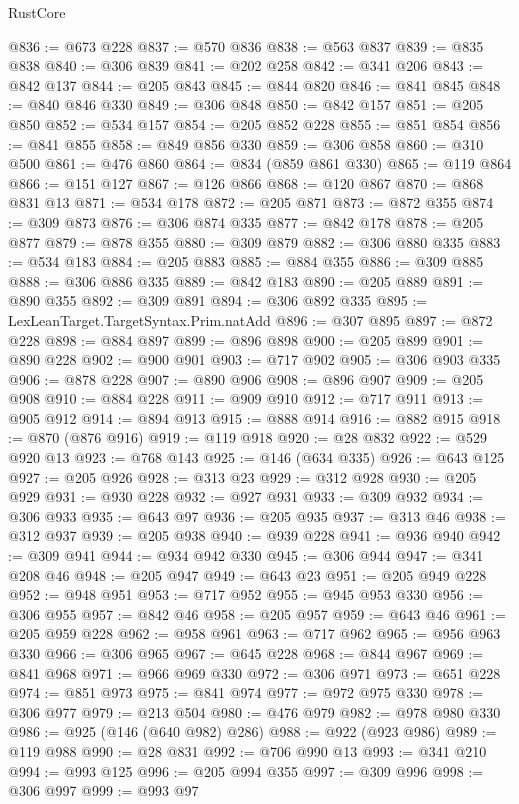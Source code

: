 \begin{lexlean}{RustCore}
\begin{coremodule}
@836 := @673 @228
@837 := @570 @836
@838 := @563 @837
@839 := @835 @838
@840 := @306 @839
@841 := @202 @258
@842 := @341 @206
@843 := @842 @137
@844 := @205 @843
@845 := @844 @820
@846 := @841 @845
@848 := @840 @846 @330
@849 := @306 @848
@850 := @842 @157
@851 := @205 @850
@852 := @534 @157
@854 := @205 @852 @228
@855 := @851 @854
@856 := @841 @855
@858 := @849 @856 @330
@859 := @306 @858
@860 := @310 @500
@861 := @476 @860
@864 := @834 (@859 @861 @330)
@865 := @119 @864
@866 := @151 @127
@867 := @126 @866
@868 := @120 @867
@870 := @868 @831 @13
@871 := @534 @178
@872 := @205 @871
@873 := @872 @355
@874 := @309 @873
@876 := @306 @874 @335
@877 := @842 @178
@878 := @205 @877
@879 := @878 @355
@880 := @309 @879
@882 := @306 @880 @335
@883 := @534 @183
@884 := @205 @883
@885 := @884 @355
@886 := @309 @885
@888 := @306 @886 @335
@889 := @842 @183
@890 := @205 @889
@891 := @890 @355
@892 := @309 @891
@894 := @306 @892 @335
@895 := LexLeanTarget.TargetSyntax.Prim.natAdd
@896 := @307 @895
@897 := @872 @228
@898 := @884 @897
@899 := @896 @898
@900 := @205 @899
@901 := @890 @228
@902 := @900 @901
@903 := @717 @902
@905 := @306 @903 @335
@906 := @878 @228
@907 := @890 @906
@908 := @896 @907
@909 := @205 @908
@910 := @884 @228
@911 := @909 @910
@912 := @717 @911
@913 := @905 @912
@914 := @894 @913
@915 := @888 @914
@916 := @882 @915
@918 := @870 (@876 @916)
@919 := @119 @918
@920 := @28 @832
@922 := @529 @920 @13
@923 := @768 @143
@925 := @146 (@634 @335)
@926 := @643 @125
@927 := @205 @926
@928 := @313 @23
@929 := @312 @928
@930 := @205 @929
@931 := @930 @228
@932 := @927 @931
@933 := @309 @932
@934 := @306 @933
@935 := @643 @97
@936 := @205 @935
@937 := @313 @46
@938 := @312 @937
@939 := @205 @938
@940 := @939 @228
@941 := @936 @940
@942 := @309 @941
@944 := @934 @942 @330
@945 := @306 @944
@947 := @341 @208 @46
@948 := @205 @947
@949 := @643 @23
@951 := @205 @949 @228
@952 := @948 @951
@953 := @717 @952
@955 := @945 @953 @330
@956 := @306 @955
@957 := @842 @46
@958 := @205 @957
@959 := @643 @46
@961 := @205 @959 @228
@962 := @958 @961
@963 := @717 @962
@965 := @956 @963 @330
@966 := @306 @965
@967 := @645 @228
@968 := @844 @967
@969 := @841 @968
@971 := @966 @969 @330
@972 := @306 @971
@973 := @651 @228
@974 := @851 @973
@975 := @841 @974
@977 := @972 @975 @330
@978 := @306 @977
@979 := @213 @504
@980 := @476 @979
@982 := @978 @980 @330
@986 := @925 (@146 (@640 @982) @286)
@988 := @922 (@923 @986)
@989 := @119 @988
@990 := @28 @831
@992 := @706 @990 @13
@993 := @341 @210
@994 := @993 @125
@996 := @205 @994 @355
@997 := @309 @996
@998 := @306 @997
@999 := @993 @97

\end{coremodule}
\end{lexlean}
